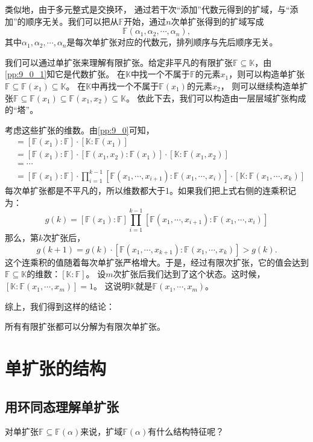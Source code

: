 \documentclass[12pt,UTF8]{ctexbook}
\begin{document}
\begin{appendix}
类似地，由于多元整式是交换环，
通过若干次“添加”代数元得到的扩域，与“添加”的顺序无关。我们可以把从$\mathbb{F}$开始，通过$n$次单扩张得到的扩域写成
$$\mathbb{F}(\alpha_1, \alpha_2, \cdots, \alpha_n),$$
其中$\alpha_1, \alpha_2, \cdots, \alpha_n$是每次单扩张对应的代数元，排列顺序与先后顺序无关。

我们可以通过单扩张来理解有限扩张。给定非平凡的有限扩张$\mathbb{F} \subseteq \mathbb{K}$，由\ref{pp:9_0_1}知它是代数扩张。
在$\mathbb{K}$中找一个不属于$\mathbb{F}$的元素$x_1$，则可以构造单扩张$\mathbb{F} \subseteq \mathbb{F}(x_1) \subseteq \mathbb{K}$。
在$\mathbb{K}$中再找一个不属于$\mathbb{F}(x_1)$的元素$x_2$，
则可以继续构造单扩张$\mathbb{F} \subseteq \mathbb{F}(x_1) \subseteq \mathbb{F}(x_1, x_2) \subseteq \mathbb{K}$。
依此下去，我们可以构造由一层层域扩张构成的“塔”。

考虑这些扩张的维数。由\ref{pp:9_0}可知，
\begin{align*}
    [\mathbb{K} : \mathbb{F}] &= [\mathbb{F}(x_1) : \mathbb{F}]\cdot [\mathbb{K} : \mathbb{F}(x_1)]  \\
    &= [\mathbb{F}(x_1) : \mathbb{F}]\cdot [\mathbb{F}(x_1,x_2) : \mathbb{F}(x_1)] \cdot [\mathbb{K} : \mathbb{F}(x_1,x_2)]  \\
    &= \cdots  \\
    &= [\mathbb{F}(x_1) : \mathbb{F}]\cdot \prod_{i=1}^{k-1} [\mathbb{F}(x_1,\cdots,x_{i+1}) : \mathbb{F}(x_1,\cdots,x_i)] \cdot [\mathbb{K} : \mathbb{F}(x_1,\cdots,x_k)] 
\end{align*}
每次单扩张都是不平凡的，所以维数都大于1。如果我们把上式右侧的连乘积记为：
$$ g(k) = [\mathbb{F}(x_1) : \mathbb{F}] \prod_{i=1}^{k-1} [\mathbb{F}(x_1,\cdots,x_{i+1}) : \mathbb{F}(x_1,\cdots,x_i)]$$
那么，第$k$次扩张后，
$$g(k+1) = g(k) \cdot [\mathbb{F}(x_1,\cdots,x_{k+1}) : \mathbb{F}(x_1,\cdots,x_k)] > g(k).$$
这个连乘积的值随着每次单扩张严格增大。于是，经过有限次扩张，它的值会达到$\mathbb{F} \subseteq \mathbb{K}$的维数：$[\mathbb{K} : \mathbb{F}]$。
设$m$次扩张后我们达到了这个状态。这时候，$[\mathbb{K} : \mathbb{F}(x_1,\cdots , x_m)] = 1$。
这说明$\mathbb{K}$就是$\mathbb{F}(x_1,\cdots,x_m)$。

综上，我们得到这样的结论：
\begin{pp}\label{pp:9_2}
    所有有限扩张都可以分解为有限次单扩张。
\end{pp}

\section{单扩张的结构}
\subsection{用环同态理解单扩张}
对单扩张$\mathbb{F} \subseteq \mathbb{F}(\alpha)$来说，扩域$\mathbb{F}(\alpha)$有什么结构特征呢？


\end{appendix}
\end{document}
